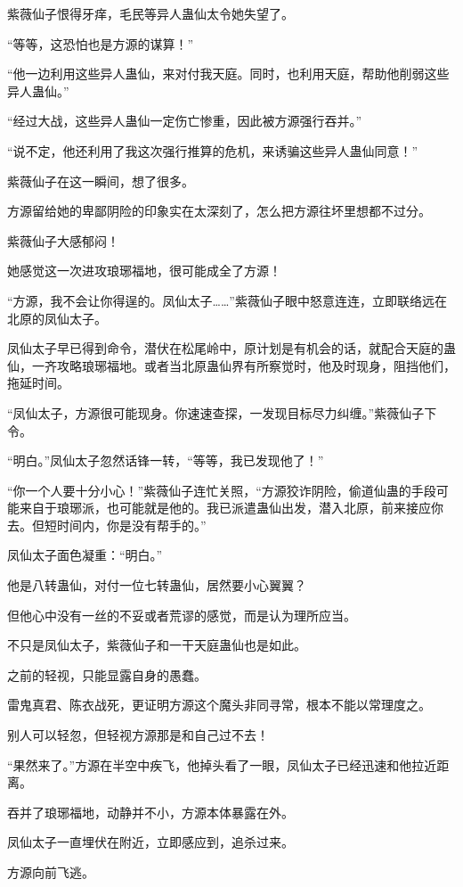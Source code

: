 \begin{this_body}
紫薇仙子恨得牙痒，毛民等异人蛊仙太令她失望了。

“等等，这恐怕也是方源的谋算！”

“他一边利用这些异人蛊仙，来对付我天庭。同时，也利用天庭，帮助他削弱这些异人蛊仙。”

“经过大战，这些异人蛊仙一定伤亡惨重，因此被方源强行吞并。”

“说不定，他还利用了我这次强行推算的危机，来诱骗这些异人蛊仙同意！”

紫薇仙子在这一瞬间，想了很多。

方源留给她的卑鄙阴险的印象实在太深刻了，怎么把方源往坏里想都不过分。

紫薇仙子大感郁闷！

她感觉这一次进攻琅琊福地，很可能成全了方源！

“方源，我不会让你得逞的。凤仙太子……”紫薇仙子眼中怒意连连，立即联络远在北原的凤仙太子。

凤仙太子早已得到命令，潜伏在松尾岭中，原计划是有机会的话，就配合天庭的蛊仙，一齐攻略琅琊福地。或者当北原蛊仙界有所察觉时，他及时现身，阻挡他们，拖延时间。

“凤仙太子，方源很可能现身。你速速查探，一发现目标尽力纠缠。”紫薇仙子下令。

“明白。”凤仙太子忽然话锋一转，“等等，我已发现他了！”

“你一个人要十分小心！”紫薇仙子连忙关照，“方源狡诈阴险，偷道仙蛊的手段可能来自于琅琊派，也可能就是他的。我已派遣蛊仙出发，潜入北原，前来接应你去。但短时间内，你是没有帮手的。”

凤仙太子面色凝重：“明白。”

他是八转蛊仙，对付一位七转蛊仙，居然要小心翼翼？

但他心中没有一丝的不妥或者荒谬的感觉，而是认为理所应当。

不只是凤仙太子，紫薇仙子和一干天庭蛊仙也是如此。

之前的轻视，只能显露自身的愚蠢。

雷鬼真君、陈衣战死，更证明方源这个魔头非同寻常，根本不能以常理度之。

别人可以轻忽，但轻视方源那是和自己过不去！

“果然来了。”方源在半空中疾飞，他掉头看了一眼，凤仙太子已经迅速和他拉近距离。

吞并了琅琊福地，动静并不小，方源本体暴露在外。

凤仙太子一直埋伏在附近，立即感应到，追杀过来。

方源向前飞逃。


\end{this_body}

